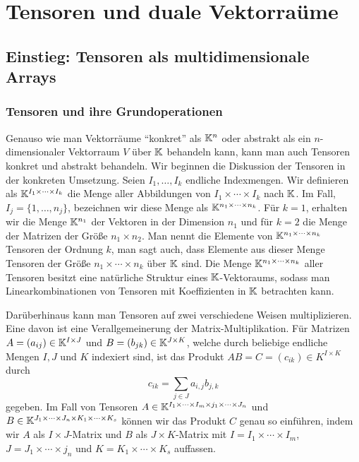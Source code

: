 	
	
	\section{Tensoren und duale Vektorraüme} 
	
	\subsection{Einstieg: Tensoren als multidimensionale Arrays} 
	
	\subsubsection{Tensoren und ihre Grundoperationen}
	
	Genauso wie man Vektorräume ``konkret'' als $\mathbb K^n$ oder abstrakt als ein $n$-dimensionaler Vektorraum $V$ über $\mathbb K$ behandeln kann, kann man auch Tensoren konkret und abstrakt behandeln. Wir beginnen die Diskussion der Tensoren in der konkreten Umsetzung. Seien $I_1,\ldots, I_k$ endliche Indexmengen. Wir definieren als $\mathbb K^{I_1 \times \cdots \times I_k}$ die Menge aller Abbildungen von $I_1 \times \cdots \times I_k$ nach $\mathbb K$. Im Fall, $I_j = \{1,\ldots, n_j\}$, bezeichnen wir diese Menge als $\mathbb K^{n_1 \times \cdots \times n_k}$. Für $k=1$, erhalten wir die Menge $\mathbb K^{n_1}$ der Vektoren in der Dimension $n_1$ und für $k=2$ die Menge der Matrizen der Größe $n_1 \times n_2$. Man nennt die Elemente von $\mathbb K^{n_1 \times \cdots \times n_k}$ Tensoren der Ordnung $k$, man sagt auch, dass Elemente aus dieser Menge Tensoren der Größe $n_1 \times \cdots \times n_k$ über $\mathbb K$ sind. Die Menge  $\mathbb K^{n_1 \times \cdots \times n_k}$ aller Tensoren besitzt eine natürliche Struktur eines $\mathbb K$-Vektoraums, sodass man Linearkombinationen von Tensoren mit Koeffizienten in $\mathbb K$ betrachten kann. 
	
	Darüberhinaus kann man Tensoren auf zwei verschiedene Weisen multiplizieren. Eine davon ist eine Verallgemeinerung der Matrix-Multiplikation. Für Matrizen $A = (a_{ij}) \in \mathbb K^{I \times J}$ und $B = (b_{jk}) \in \mathbb K^{J \times K}$, welche durch beliebige endliche Mengen $I, J$ und $K$ indexiert sind, ist das Produkt $AB = C = (c_{ik}) \in K^{I \times K}$ durch 
	\[
	c_{ik} = \sum_{j \in J} a_{i,j} b_{j,k}
	\]
	gegeben. Im Fall von Tensoren $A \in \mathbb K^{I_1 \times \cdots \times I_m \times j_1 \times \cdots \times J_n}$ und $B \in \mathbb K^{J_1 \times \cdots \times J_n \times K_1 \times \cdots \times K_s}$ können wir das Produkt $C$ genau so einführen, indem wir $A$ als $I \times J$-Matrix und $B$ als $J \times K$-Matrix mit $I = I_1 \times \cdots \times I_m$, $J= J_1 \times \cdots \times j_n$ und $K= K_1 \times \cdots \times K_s$ auffassen. 
	
